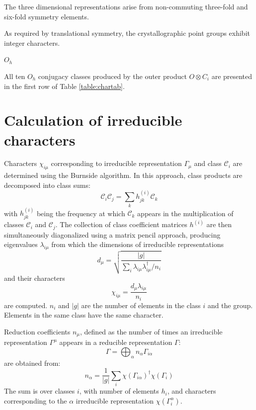 \documentclass[twocolumn,showpacs,preprintnumbers,superscriptaddress,prb,floatfix,aps,10pt]{revtex4-1}
\newcommand*{\class}{\mathcal{C}}
\begin{document}
The three dimensional representations arise from non-commuting three-fold and six-fold symmetry elements. 




As required by translational symmetry, the crystallographic point groups exhibit integer characters.





$O_h$



All ten $O_h$ conjugacy classes produced by the outer product $O \otimes C_i$ are presented in the first row of Table \ref{table:chartab}.


\section{Calculation of irreducible characters}
\label{appendix:chartab}
Characters $\chi_{i\mu}$ corresponding to irreducible representation $\Gamma_\mu$ and class $\class_i$ are determined using the Burnside algorithm.\cite{burnside_theory_2010,mckay_construction_1970,unger_computing_2006,schneider_dixons_1990,dixon_high_1967} In this approach, class products are decomposed into class sums:
\begin{equation}
\label{eq:class_coefficients}
\class_i \class_j = \sum_k h_{jk}^{(i)} \class_k
\end{equation}
with $h_{jk}^{(i)}$ being the frequency at which $\class_k$ appears in the multiplication of classes $\class_i$ and $\class_j$. The collection of class coefficient matrices $h^{(i)}$ are then simultaneously diagonalized using a matrix pencil approach, producing eigenvalues $\lambda_{i\mu}$ from which the dimensions of irreducible representations
\begin{equation}
\label{eq:irrep_dimension}
d_\mu = \sqrt{ \frac{|g|}{\sum_i \lambda_{i\mu} \lambda^{\dag}_{i\mu} / n_i }  }
\end{equation}
and their characters
\begin{equation}
\label{eq:irrep_characters}
\chi_{i\mu} = \frac{d_\mu \lambda_{i\mu}}{n_i}
\end{equation}
are computed. $n_i$ and $|g|$ are the number of elements in the class $i$ and the group. Elements in the same class have the same character.

Reduction coefficients $n_\mu$, defined as the number of times an irreducible representation $\Gamma^\mu$ appears in a reducible representation $\Gamma$:
\begin{equation}
\label{eq:irrep_decomposition}
\Gamma = \bigoplus_\alpha n_\alpha \Gamma_{i\alpha}
\end{equation}
are obtained from:
\begin{equation}
\label{eq:irrep_decomposition_coefficients}
n_\alpha = \frac{1}{|g|} \sum_i \chi\left(\Gamma_{i\alpha}\right)^\dag \chi\left(\Gamma_i\right)
\end{equation}
The sum is over classes $i$, with number of elements $h_i$, and characters corresponding to the $\alpha$ irreducible representation $\chi(\Gamma_i^\alpha)$.
\end{document}
